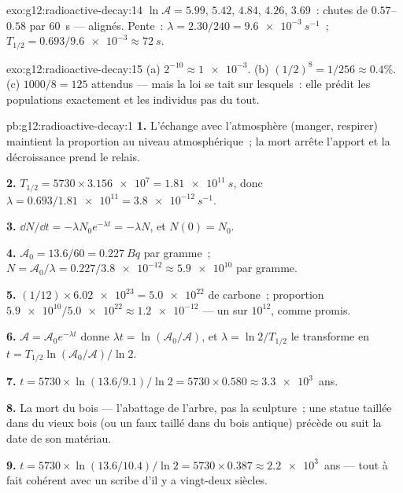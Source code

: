 \begin{solution}{exo:g12:radioactive-decay:14}
$\ln \mathcal A = 5.99$, $5.42$, $4.84$, $4.26$, $3.69$~: chutes de
$0.57$--$0.58$ par \qty{60}{s} --- alignés. Pente~:
$\lambda = 2.30/240 = \qty{9.6e-3}{s^{-1}}$~;
$T_{1/2} = 0.693/\num{9.6e-3} \approx \qty{72}{s}$.
\end{solution}

\begin{solution}{exo:g12:radioactive-decay:15}
(a) $2^{-10} \approx \num{1e-3}$. (b) $(1/2)^8 = 1/256 \approx
0.4\%$. (c) $1000/8 = 125$ attendus --- mais la loi se tait sur
lesquels~: elle prédit les populations exactement et les individus
pas du tout.
\end{solution}

\begin{solution}{pb:g12:radioactive-decay:1}
\textbf{1.} L'échange avec l'atmosphère (manger, respirer) maintient
la proportion au niveau atmosphérique~; la mort arrête l'apport et
la décroissance prend le relais.

\textbf{2.} $T_{1/2} = \num{5730} \times \num{3.156e7} =
\qty{1.81e11}{s}$, donc $\lambda = 0.693/\num{1.81e11} =
\qty{3.8e-12}{s^{-1}}$.

\textbf{3.} $\dd N/\dd t = -\lambda N_0 e^{-\lambda t} = -\lambda N$,
et $N(0) = N_0$.

\textbf{4.} $\mathcal A_0 = 13.6/60 = \qty{0.227}{Bq}$ par gramme~;
$N = \mathcal A_0/\lambda = 0.227/\num{3.8e-12} \approx \num{5.9e10}$
 par gramme.

\textbf{5.} $(1/12) \times \num{6.02e23} = \num{5.0e22}$
 de carbone~; proportion
$\num{5.9e10}/\num{5.0e22} \approx \num{1.2e-12}$ --- un sur
$10^{12}$, comme promis.

\textbf{6.} $\mathcal A = \mathcal A_0 e^{-\lambda t}$ donne
$\lambda t = \ln(\mathcal A_0/\mathcal A)$, et $\lambda =
\ln 2/T_{1/2}$ le transforme en
$t = T_{1/2}\ln(\mathcal A_0/\mathcal A)/\ln 2$.

\textbf{7.} $t = \num{5730} \times \ln(13.6/9.1)/\ln 2 =
\num{5730} \times 0.580 \approx \num{3.3e3}$~ans.

\textbf{8.} La mort du bois --- l'abattage de l'arbre, pas la
sculpture~; une statue taillée dans du vieux bois (ou un faux taillé
dans du bois antique) précède ou suit la date de son matériau.

\textbf{9.} $t = \num{5730} \times \ln(13.6/10.4)/\ln 2 =
\num{5730} \times 0.387 \approx \num{2.2e3}$~ans --- tout à fait
cohérent avec un scribe d'il y a vingt-deux siècles.


\end{solution}
